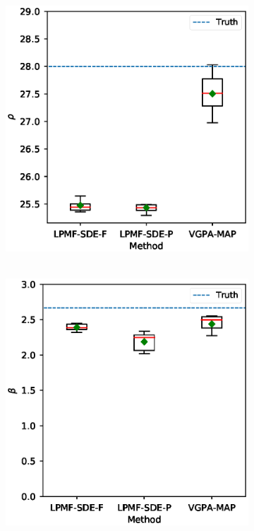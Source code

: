 \begin{figure}
\begin{subfigure}{0.48\textwidth}
        \caption{\ }
        \label{fig-lorenz-63-parameters-sigma-boxplot}
    \end{subfigure}
    \begin{subfigure}{0.48\textwidth}
        \includegraphics[width=\linewidth]{graphics/lorenz-63-parameters-rho-boxplot}
        \caption{\ }
        \label{fig-lorenz-63-parameters-rho-boxplot}
    \end{subfigure}
    \begin{subfigure}{0.48\textwidth}
        \includegraphics[width=\linewidth]{graphics/lorenz-63-parameters-beta-boxplot}

\end{subfigure}
\end{figure}
